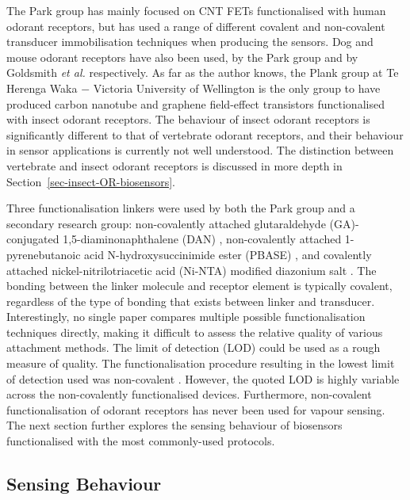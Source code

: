 \documentclass[
  a4paper,
]{scrbook}
\begin{document}
\begin{landscape}
\begin{center}
\end{center}
\end{landscape}
\restoregeometry %

The Park group has mainly focused on CNT FETs functionalised with human
odorant receptors, but has used a range of different covalent and
non-covalent transducer immobilisation techniques when producing the
sensors. Dog and mouse odorant receptors have also been used, by the
Park group and by Goldsmith \emph{et al.} respectively. As far as the
author knows, the Plank group at Te Herenga Waka \(-\) Victoria
University of Wellington is the only group to have produced carbon
nanotube and graphene field-effect transistors functionalised with
insect odorant receptors. The behaviour of insect odorant receptors is
significantly different to that of vertebrate odorant receptors, and
their behaviour in sensor applications is currently not well understood.
The distinction between vertebrate and insect odorant receptors is
discussed in more depth in Section~\ref{sec-insect-OR-biosensors}.

Three functionalisation linkers were used by both the Park group and a
secondary research group: non-covalently attached glutaraldehyde
(GA)-conjugated 1,5-diaminonaphthalene (DAN)
\autocite{Kwon2015,Goodwin2021}, non-covalently attached
1-pyrenebutanoic acid N-hydroxysuccinimide ester (PBASE)
\autocite{Murugathas2020,Yoo2022}, and covalently attached
nickel-nitrilotriacetic acid (Ni-NTA) modified diazonium salt
\autocite{Goldsmith2011,Son2017}. The bonding between the linker
molecule and receptor element is typically covalent, regardless of the
type of bonding that exists between linker and transducer.
Interestingly, no single paper compares multiple possible
functionalisation techniques directly, making it difficult to assess the
relative quality of various attachment methods. The limit of detection
(LOD) could be used as a rough measure of quality. The functionalisation
procedure resulting in the lowest limit of detection used was
non-covalent \autocite{Park2012}. However, the quoted LOD is highly
variable across the non-covalently functionalised devices. Furthermore,
non-covalent functionalisation of odorant receptors has never been used
for vapour sensing. The next section further explores the sensing
behaviour of biosensors functionalised with the most commonly-used
protocols.

\hypertarget{sec-biosensor-methods}{%
\subsection{Sensing Behaviour}\label{sec-biosensor-methods}}
\end{document}
